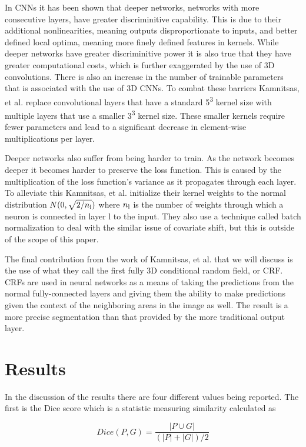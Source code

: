 \documentclass{sig-alternate}
\begin{document}
In CNNs it has been shown that deeper networks, networks with more consecutive layers, have greater discriminitive capability. This is due to their additional nonlinearities, meaning outputs disproportionate to inputs, and better defined local optima, meaning more finely defined features in kernels. While deeper networks have greater discriminitive power it is also true that they have greater computational costs, which is further exaggerated by the use of 3D convolutions. There is also an increase in the number of trainable parameters that is associated with the use of 3D CNNs. To combat these barriers Kamnitsas, et al. replace convolutional layers that have a standard 5\textsuperscript{3} kernel size with multiple layers that use a smaller 3\textsuperscript{3} kernel size. These smaller kernels require fewer parameters and lead to a significant decrease in element-wise multiplications per layer.~\cite{Kamnitsas:2017}

Deeper networks also suffer from being harder to train. As the network becomes deeper it becomes harder to preserve the loss function. This is caused by the multiplication of the loss function's variance as it propagates through each layer. To alleviate this Kamnitsas, et al. initialize their kernel weights to the normal distribution $N(0,\sqrt{2/n\textsubscript{l}})$ where $n\textsubscript{l}$ is the number of weights through which a neuron is connected in layer l to the input. They also use a technique called batch normalization to deal with the similar issue of covariate shift, but this is outside of the scope of this paper.

The final contribution from the work of Kamnitsas, et al. that we will discuss is the use of what they call the first fully 3D conditional random field, or CRF. CRFs are used in neural networks as a means of taking the predictions from the normal fully-connected layers and giving them the ability to make predictions given the context of the neighboring areas in the image as well. The result is a more precise segmentation than that provided by the more traditional output layer.


\section{Results}
\label{sec:results}
In the discussion of the results there are four different values being reported. The first is the Dice score which is a statistic measuring similarity calculated as

\begin{equation}
Dice(P,G) = \frac{|P \cup G|}{(|P|+|G|)/2}
\end{equation}
\end{document}

